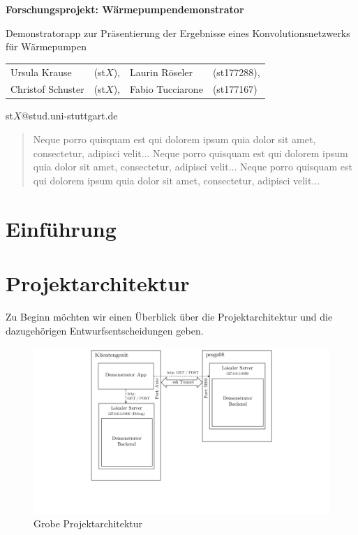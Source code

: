 \documentclass[a4paper]{extarticle}
\begin{document}
    \begin{center}
        \huge
        \textbf{Forschungsprojekt: Wärmepumpendemonstrator}
            
        \vspace{0.4cm}
        \large
        Demonstratorapp zur Präsentierung der Ergebnisse eines Konvolutionsnetzwerks für Wärmepumpen
            
        \vspace{0.6cm}
        \normalsize
        \begin{tabular}{llll}
            Ursula Krause & (st$X$), & Laurin Röseler & (st177288),\\
            Christof Schuster & (st$X$), & Fabio Tucciarone & (st177167)
        \end{tabular}

        \vspace{0.3cm}
        st$X$@stud.uni-stuttgart.de
        
        \vspace{0.8cm}
    \end{center}

    \begin{abstract}
        Neque porro quisquam est qui dolorem ipsum quia dolor sit amet, consectetur, adipisci velit...
        Neque porro quisquam est qui dolorem ipsum quia dolor sit amet, consectetur, adipisci velit...
        Neque porro quisquam est qui dolorem ipsum quia dolor sit amet, consectetur, adipisci velit...
    \end{abstract}

    \section{Einführung}

    


    \section{Projektarchitektur}

    Zu Beginn möchten wir einen Überblick über die Projektarchitektur und die dazugehörigen Entwurfsentscheidungen geben.
    
    \begin{figure}[H]
        \centering
        \includegraphics[trim={5cm 3.5cm 5cm 0}, clip, width=0.8\linewidth]{bilder/architektur_projekt.pdf}
        \caption{Grobe Projektarchitektur} \label{fig:architektur-projekt}
    \end{figure}
\end{document}
